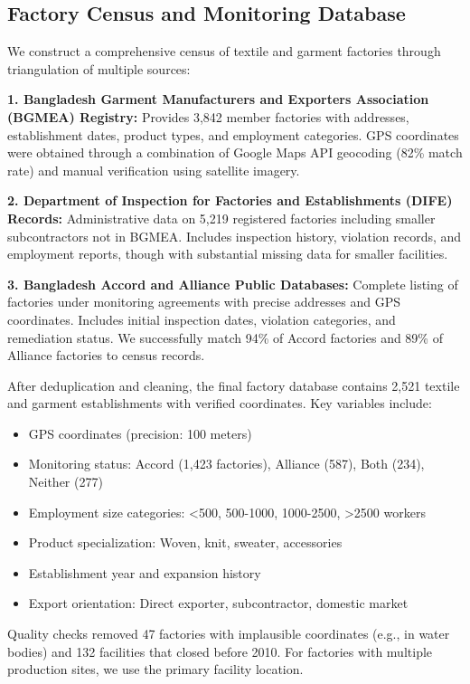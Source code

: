 \documentclass[12pt]{article}
\begin{document}
\subsection{Factory Census and Monitoring Database}

We construct a comprehensive census of textile and garment factories through triangulation of multiple sources:

\textbf{1. Bangladesh Garment Manufacturers and Exporters Association (BGMEA) Registry:} Provides 3,842 member factories with addresses, establishment dates, product types, and employment categories. GPS coordinates were obtained through a combination of Google Maps API geocoding (82\% match rate) and manual verification using satellite imagery.

\textbf{2. Department of Inspection for Factories and Establishments (DIFE) Records:} Administrative data on 5,219 registered factories including smaller subcontractors not in BGMEA. Includes inspection history, violation records, and employment reports, though with substantial missing data for smaller facilities.

\textbf{3. Bangladesh Accord and Alliance Public Databases:} Complete listing of factories under monitoring agreements with precise addresses and GPS coordinates. Includes initial inspection dates, violation categories, and remediation status. We successfully match 94\% of Accord factories and 89\% of Alliance factories to census records.

After deduplication and cleaning, the final factory database contains 2,521 textile and garment establishments with verified coordinates. Key variables include:

\begin{itemize}
\item GPS coordinates (precision: 100 meters)
\item Monitoring status: Accord (1,423 factories), Alliance (587), Both (234), Neither (277)
\item Employment size categories: <500, 500-1000, 1000-2500, >2500 workers
\item Product specialization: Woven, knit, sweater, accessories
\item Establishment year and expansion history
\item Export orientation: Direct exporter, subcontractor, domestic market
\end{itemize}

Quality checks removed 47 factories with implausible coordinates (e.g., in water bodies) and 132 facilities that closed before 2010. For factories with multiple production sites, we use the primary facility location.
\end{document}
